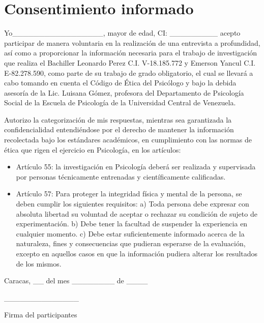 
\chapter{Consentimiento informado}

\small

Yo\_\_\_\_\_\_\_\_\_\_\_\_\_\_\_\_\_, mayor de edad, CI: \_\_\_\_\_\_\_\_\_ acepto
participar de manera voluntaria en la realización de una entrevista a
profundidad, así como a proporcionar la información necesaria para el trabajo de
investigación que realiza el Bachiller Leonardo Perez C.I. V-18.185.772 y
Emerson Yancul C.I. E-82.278.590, como parte de su trabajo de grado
obligatorio, el cual se llevará a cabo tomando en cuenta el Código de Ética del
Psicólogo y bajo la debida asesoría de la Lic. Luisana Gómez, profesora del
Departamento de Psicología Social de la Escuela de Psicología de la Universidad
Central de Venezuela.

Autorizo la categorización de mis respuestas, mientras sea garantizada la
confidencialidad entendiéndose por el derecho de mantener la información
recolectada bajo los estándares académicos, en cumplimiento con las normas de
ética que rigen el ejercicio en Psicología, en los artículos:

\begin{itemize}
    \item Artículo 55: la investigación en Psicología deberá ser realizada y
    supervisada por personas técnicamente entrenadas y científicamente
    calificadas.
    \item Artículo 57: Para proteger la integridad física y mental de la
    persona, se deben cumplir los siguientes requisitos: a) Toda persona debe
    expresar con absoluta libertad su voluntad de aceptar o rechazar su
    condición de sujeto de experimentación. b) Debe tener la facultad de
    suspender la experiencia en cualquier momento. c) Debe estar suficientemente
    informado acerca de la naturaleza, fines y consecuencias que pudieran
    esperarse de la evaluación, excepto en aquellos casos en que la información
    pudiera alterar los resultados de los mismos.
\end{itemize}

\centering

Caracas, \_\_ del mes \_\_\_\_\_\_\_\_ de \_\_\_\_

\vfill

\_\_\_\_\_\_\_\_\_\_\_\_\_\_

Firma del participantes